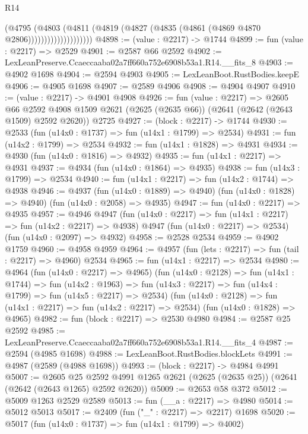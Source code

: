 \begin{lexlean}{R14}
\begin{coremodule}
                            (@4795
                              (@4803
                                (@4811
                                  (@4819 (@4827 (@4835 (@4861 (@4869 @4870 @2806))))))))))))))))))))
@4898 := (value : @2217) -> @1744
@4899 := fun (value : @2217) => @2529
@4901 := @2587 @66 @2592
@4902 := LexLeanPreserve.Ccaeccaaba02a7ff660a752e6908b53a1.R14.__fits_8
@4903 := @4902 @1698
@4904 := @2594 @4903
@4905 := LexLeanBoot.RustBodies.keepE
@4906 := @4905 @1698
@4907 := @2589 @4906
@4908 := @4904 @4907
@4910 := (value : @2217) -> @4901 @4908
@4926 := fun (value : @2217) =>
  @2605
    @66
    @2592
    @4908
    @1509
    @2621
    (@2625 (@2635 @66))
    (@2641 (@2642 (@2643 @1509) @2592 @2620))
    @2725
@4927 := (block : @2217) -> @1744
@4930 := @2533 (fun (u14x0 : @1737) => fun (u14x1 : @1799) => @2534)
@4931 := fun (u14x2 : @1799) => @2534
@4932 := fun (u14x1 : @1828) => @4931
@4934 := @4930 (fun (u14x0 : @1816) => @4932)
@4935 := fun (u14x1 : @2217) => @4931
@4937 := @4934 (fun (u14x0 : @1864) => @4935)
@4938 := fun (u14x3 : @1799) => @2534
@4940 := fun (u14x1 : @2217) => fun (u14x2 : @1744) => @4938
@4946 := @4937
    (fun (u14x0 : @1889) => @4940)
    (fun (u14x0 : @1828) => @4940)
    (fun (u14x0 : @2058) => @4935)
@4947 := fun (u14x0 : @2217) => @4935
@4957 := @4946
    @4947
    (fun (u14x0 : @2217) => fun (u14x1 : @2217) => fun (u14x2 : @2217) => @4938)
    @4947
    (fun (u14x0 : @2217) => @2534)
    (fun (u14x0 : @2097) => @4932)
@4958 := @2528 @2534
@4959 := @4902 @1759
@4960 := @4958 @4959
@4964 := @4957 (fun (lets : @2217) => fun (tail : @2217) => @4960) @2534
@4965 := fun (u14x1 : @2217) => @2534
@4980 := @4964
    (fun (u14x0 : @2217) => @4965)
    (fun (u14x0 : @2128) =>
    fun (u14x1 : @1744) =>
    fun (u14x2 : @1963) =>
    fun (u14x3 : @2217) => fun (u14x4 : @1799) => fun (u14x5 : @2217) => @2534)
    (fun (u14x0 : @2128) => fun (u14x1 : @2217) => fun (u14x2 : @2217) => @2534)
    (fun (u14x0 : @1828) => @4965)
@4982 := fun (block : @2217) => @2530 @4980
@4984 := @2587 @25 @2592
@4985 := LexLeanPreserve.Ccaeccaaba02a7ff660a752e6908b53a1.R14.__fits_4
@4987 := @2594 (@4985 @1698)
@4988 := LexLeanBoot.RustBodies.blockLets
@4991 := @4987 (@2589 (@4988 @1698))
@4993 := (block : @2217) -> @4984 @4991
@5007 := @2605
    @25
    @2592
    @4991
    @1265
    @2621
    (@2625 (@2635 @25))
    (@2641 (@2642 (@2643 @1265) @2592 @2620))
@5009 := @2653 @58 @372
@5012 := @5009 @1263 @2529 @2589
@5013 := fun (__a : @2217) => @4980
@5014 := @5012 @5013
@5017 := @2409 (fun ("_" : @2217) => @2217) @1698
@5020 := @5017 (fun (u14x0 : @1737) => fun (u14x1 : @1799) => @4002)

\end{coremodule}
\end{lexlean}
